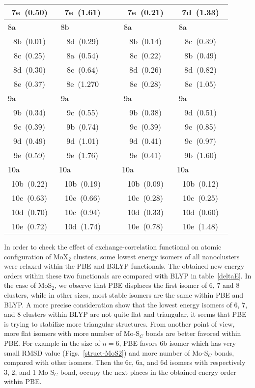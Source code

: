\documentclass[nofootinbib,10pt,aip,twocolumn,showpacs]{revtex4-1}
\begin{document}
\begin{table}
\begin{ruledtabular}
\begin{tabular}{ccccc}
  7e~(0.50)   &  7e~(1.61)   &&  7e~(0.21)    &  7d~(1.33)    \\\hline
  8a~~~~~~~~~ &  8b~~~~~~~~~ &&  8a~~~~~~~~~  &  8a~~~~~~~~~  \\  
  8b~(0.01)   &  8d~(0.29)   &&  8b~(0.14)    &  8c~(0.39)    \\  
  8c~(0.25)   &  8a~(0.54)   &&  8c~(0.22)    &  8b~(0.49)    \\  
  8d~(0.30)   &  8c~(0.64)   &&  8d~(0.26)    &  8d~(0.82)    \\  
  8e~(0.37)   &  8e~(1.270   &&  8e~(0.28)    &  8e~(1.05)    \\\hline
  9a~~~~~~~~~ &  9a~~~~~~~~~ &&  9a~~~~~~~~~  &  9a~~~~~~~~~  \\  
  9b~(0.34)   &  9c~(0.55)   &&  9b~(0.38)    &  9d~(0.51)    \\  
  9c~(0.39)   &  9b~(0.74)   &&  9c~(0.39)    &  9e~(0.85)    \\  
  9d~(0.49)   &  9d~(1.01)   &&  9d~(0.41)    &  9c~(0.97)    \\  
  9e~(0.59)   &  9e~(1.76)   &&  9e~(0.41)    &  9b~(1.60)    \\\hline
  10a~~~~~~~~ & 10a~~~~~~~~~ &&  10a~~~~~~~~~ &  10a~~~~~~~~~ \\  
  10b~(0.22)  &  10b~(0.19)  &&  10b~(0.09)   &  10b~(0.12)   \\  
  10c~(0.63)  &  10e~(0.66)  &&  10c~(0.28)   &  10c~(0.25)   \\  
  10d~(0.70)  &  10c~(0.94)  &&  10d~(0.33)   &  10d~(0.60)   \\  
  10e~(0.72)  &  10d~(1.74)  &&  10e~(0.78)   &  10e~(1.48)   \\ 
\end{tabular}
\end{ruledtabular}
\end{table}


In order to check the effect of exchange-correlation functional
on atomic configuration of MoX$_2$ clusters,
some lowest energy isomers of all nanoclusters were relaxed 
within the PBE and B3LYP functionals.
The obtained new energy orders within these two functionals
are compared with BLYP in table~\ref{deltaE}.
In the case of MoS$_2$, we observe that PBE displaces
the first isomer of 6, 7 and 8 clusters, 
while in other sizes, most stable isomers are the same within PBE and BLYP.
A more precise consideration show that the lowest energy isomers of 
6, 7, and 8 clusters within BLYP are not quite flat and triangular,
it seems that PBE is trying to stabilize more triangular structures.
From another point of view, more flat isomers with more number of 
Mo-S$_C$ bonds are better favored within PBE.
For example in the size of $n=6$, PBE favors 6b isomer 
which has very small RMSD value (Figs.~\ref{struct-MoS2})
and more number of Mo-S$_C$ bonds, compared with other isomers.
Then the 6c, 6a, and 6d isomers with respectively 3, 2, and 1 Mo-S$_C$ bond, 
occupy the next places in the obtained energy order within PBE.
\end{document}
